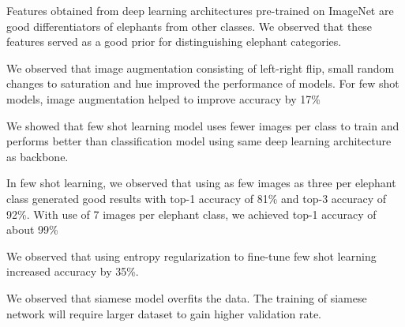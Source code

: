 \documentclass[10pt,twocolumn,letterpaper]{article}
\begin{document}
Features obtained from deep learning architectures pre-trained on ImageNet are good differentiators of elephants from other classes. We observed that these features served as a good prior for distinguishing elephant categories. 

We observed that image augmentation consisting of left-right flip, small random changes to saturation and hue improved the performance of models. For few shot models, image augmentation helped to improve accuracy by 17\%

We showed that few shot learning model uses fewer images per class to train and performs better than classification model using same deep learning architecture as backbone.

In few shot learning, we observed that using as few images as three per elephant class generated good results with top-1 accuracy of 81\% and top-3 accuracy of 92\%. With use of 7 images per elephant class, we achieved top-1 accuracy of about 99\%

We observed that using entropy regularization to fine-tune few shot learning increased accuracy by 35\%.

We observed that siamese model overfits the data. The training of siamese network will require larger dataset to gain higher validation rate. 


\end{document}

